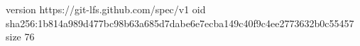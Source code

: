 version https://git-lfs.github.com/spec/v1
oid sha256:1b814a989d477bc98b63a685d7dabe6e7ecba149c40f9c4ee2773632b0c55457
size 76

